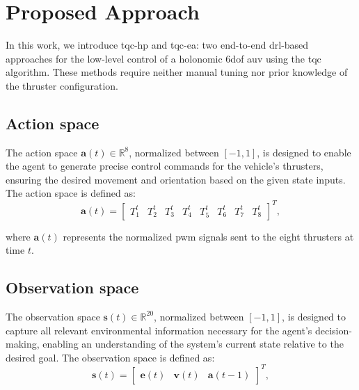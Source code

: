 \section{Proposed Approach}
\label{sec:proposed_approach}

In this work, we introduce \acf{tqc-hp} and \acf{tqc-ea}: two end-to-end \ac{drl}-based approaches for the low-level control of a holonomic \ac{6dof} \ac{auv} using the \ac{tqc} algorithm. These methods require neither manual tuning nor prior knowledge of the thruster configuration.

\subsection{Action space}

The action space $\bm{a}(t) \in \mathbb{R}^{8}$, normalized between $[-1, 1]$, is designed to enable the agent to generate precise control commands for the vehicle’s thrusters, ensuring the desired movement and orientation based on the given state inputs. The action space is defined as:
\begin{equation}
\bm{a}(t) = \begin{bmatrix}
T_{1}^t & T_{2}^t & T_{3}^t & T_{4}^t & T_{5}^t & T_{6}^t & T_{7}^t & T_{8}^t
\end{bmatrix}^T,
\label{eq:action_space}
\end{equation}

\noindent where $\bm{a}(t)$ represents the normalized \ac{pwm} signals sent to the eight thrusters at time $t$.

\subsection{Observation space}

The observation space $\bm{s}(t) \in \mathbb{R}^{20}$, normalized between $[-1, 1]$, is designed to capture all relevant environmental information necessary for the agent’s decision-making, enabling an understanding of the system’s current state relative to the desired goal. The observation space is defined as:
\begin{equation}
\bm{s}(t) = \begin{bmatrix}
\bm{e}(t) & \bm{v}(t) & \bm{a}(t-1)
\end{bmatrix}^T,
\label{eq:observation_space}
\end{equation}

